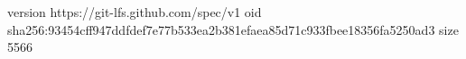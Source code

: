 version https://git-lfs.github.com/spec/v1
oid sha256:93454cff947ddfdef7e77b533ea2b381efaea85d71c933fbee18356fa5250ad3
size 5566

